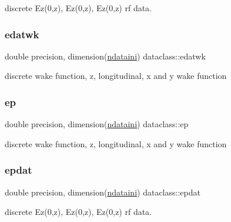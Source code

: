 discrete Ez(0,z), Ez\textquotesingle{}(0,z), Ez\textquotesingle{}\textquotesingle{}(0,z) rf data. 

\mbox{\label{namespacedataclass_aa19cbc20e7c55cc7625fe414eb6283d7}} 
\subsubsection{\texorpdfstring{edatwk}{edatwk}}
{\footnotesize\ttfamily double precision, dimension(\mbox{\hyperlink{namespacedataclass_a2578bbe9c4dc0892ee08a8619cd7e978}{ndataini}}) dataclass\+::edatwk}



discrete wake function, z, longitudinal, x and y wake function 

\mbox{\label{namespacedataclass_ab79752b3c2a7160b76ff3430350e23e3}} 
\subsubsection{\texorpdfstring{ep}{ep}}
{\footnotesize\ttfamily double precision, dimension(\mbox{\hyperlink{namespacedataclass_a2578bbe9c4dc0892ee08a8619cd7e978}{ndataini}}) dataclass\+::ep}



discrete wake function, z, longitudinal, x and y wake function 

\mbox{\label{namespacedataclass_a2f77b697b14f3e0d557f044ea69402d8}} 
\subsubsection{\texorpdfstring{epdat}{epdat}}
{\footnotesize\ttfamily double precision, dimension(\mbox{\hyperlink{namespacedataclass_a2578bbe9c4dc0892ee08a8619cd7e978}{ndataini}}) dataclass\+::epdat}



discrete Ez(0,z), Ez\textquotesingle{}(0,z), Ez\textquotesingle{}\textquotesingle{}(0,z) rf data. 

\mbox{\label{namespacedataclass_a0efc01b23a17c274db7c427517e41e22}} 
